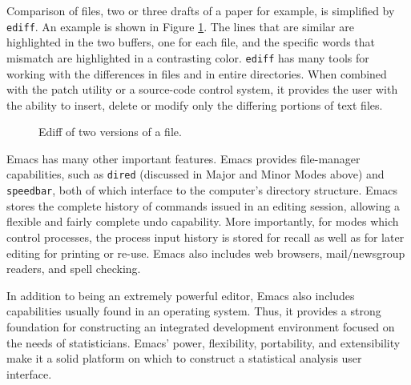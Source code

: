 \documentclass{article}
\newcommand{\stexttt}[1]{{\small\texttt{#1}}}
\begin{document}
Comparison of files, two or three drafts of a paper for example, is
simplified by \stexttt{ediff}.  An example is shown in Figure
\ref{f.ediff}.  The lines that are similar are highlighted in the two
buffers, one for each file, and the specific words that mismatch are
highlighted in a contrasting color.  \stexttt{ediff} has many tools
for working with the differences in files and in entire directories.
When combined with the patch utility or a source-code control system,
it provides the user with the ability to insert, delete or modify only
the differing portions of text files.

\begin{figure}[tbp]
  \caption{Ediff of two versions of a file.}
  \label{f.ediff}
\end{figure}

Emacs has many other important features.  Emacs provides file-manager
capabilities, such as \stexttt{dired} (discussed in Major and Minor
Modes above) and \stexttt{speedbar}, both of which interface to the
computer's directory structure.  Emacs stores the complete history of
commands issued in an editing session, allowing a flexible and fairly
complete undo capability.  More importantly, for modes which control
processes, the process input history is stored for recall as well as
for later editing for printing or re-use.  Emacs also includes web
browsers, mail/newsgroup readers, and spell checking.

In addition to being an extremely powerful editor, Emacs also
includes capabilities usually found in an operating system.  Thus, it
provides a strong foundation for constructing an integrated
development environment focused on the needs of statisticians.  Emacs'
power, flexibility, portability, and extensibility make it a solid
platform on which to construct a statistical analysis user interface.
\end{document}
